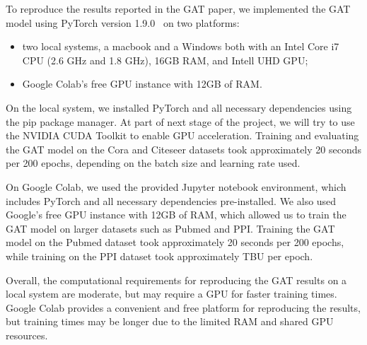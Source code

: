 To reproduce the results reported in the GAT paper, we implemented the GAT model using PyTorch version 1.9.0~\cite{paszke2019pytorch} on two platforms:
\begin{itemize}
    \item two local systems, a macbook and a Windows both with an Intel Core i7 CPU (2.6 GHz and 1.8 GHz), 16GB RAM,
    and Intell UHD GPU;
    \item Google Colab's free GPU instance with 12GB of RAM\@.
\end{itemize}

On the local system, we installed PyTorch and all necessary dependencies using the pip package manager.
At part of next stage of the project, we will try to use the NVIDIA CUDA Toolkit to enable GPU acceleration.
Training and evaluating the GAT model on the Cora and Citeseer datasets took approximately 20 seconds per 200
epochs, depending on the batch size and learning rate used.

On Google Colab, we used the provided Jupyter notebook environment, which includes PyTorch and all necessary dependencies pre-installed.
We also used Google's free GPU instance with 12GB of RAM, which allowed us to train the GAT model on larger datasets such as Pubmed and PPI.
Training the GAT model on the Pubmed dataset took approximately 20 seconds per 200 epochs, while training on the PPI dataset took approximately TBU per epoch.

Overall, the computational requirements for reproducing the GAT results on a local system are moderate, but may require a GPU for faster training times.
Google Colab provides a convenient and free platform for reproducing the results, but training times may be longer due to the limited RAM and shared GPU resources.
